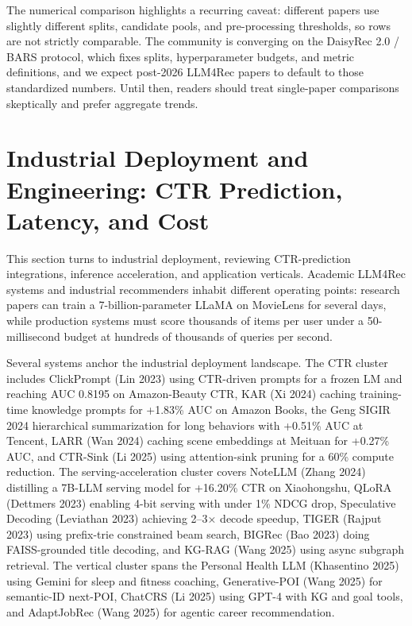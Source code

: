 The numerical comparison highlights a recurring caveat: different papers use slightly different splits, candidate pools, and pre-processing thresholds, so rows are not strictly comparable. The community is converging on the DaisyRec 2.0 / BARS protocol, which fixes splits, hyperparameter budgets, and metric definitions, and we expect post-2026 LLM4Rec papers to default to those standardized numbers. Until then, readers should treat single-paper comparisons skeptically and prefer aggregate trends.

\section{Industrial Deployment and Engineering: CTR Prediction, Latency, and Cost}\label{industrial-deployment-and-engineering-ctr-prediction-latency-and-cost}

This section turns to industrial deployment, reviewing CTR-prediction integrations, inference acceleration, and application verticals. Academic LLM4Rec systems and industrial recommenders inhabit different operating points: research papers can train a 7-billion-parameter LLaMA on MovieLens for several days, while production systems must score thousands of items per user under a 50-millisecond budget at hundreds of thousands of queries per second.

Several systems anchor the industrial deployment landscape. The CTR cluster includes ClickPrompt (Lin 2023) using CTR-driven prompts for a frozen LM and reaching AUC 0.8195 on Amazon-Beauty CTR, KAR (Xi 2024) caching training-time knowledge prompts for +1.83\% AUC on Amazon Books, the Geng SIGIR 2024 hierarchical summarization for long behaviors with +0.51\% AUC at Tencent, LARR (Wan 2024) caching scene embeddings at Meituan for +0.27\% AUC, and CTR-Sink (Li 2025) using attention-sink pruning for a 60\% compute reduction. The serving-acceleration cluster covers NoteLLM (Zhang 2024) distilling a 7B-LLM serving model for +16.20\% CTR on Xiaohongshu, QLoRA (Dettmers 2023) enabling 4-bit serving with under 1\% NDCG drop, Speculative Decoding (Leviathan 2023) achieving 2--3× decode speedup, TIGER (Rajput 2023) using prefix-trie constrained beam search, BIGRec (Bao 2023) doing FAISS-grounded title decoding, and KG-RAG (Wang 2025) using async subgraph retrieval. The vertical cluster spans the Personal Health LLM (Khasentino 2025) using Gemini for sleep and fitness coaching, Generative-POI (Wang 2025) for semantic-ID next-POI, ChatCRS (Li 2025) using GPT-4 with KG and goal tools, and AdaptJobRec (Wang 2025) for agentic career recommendation.

